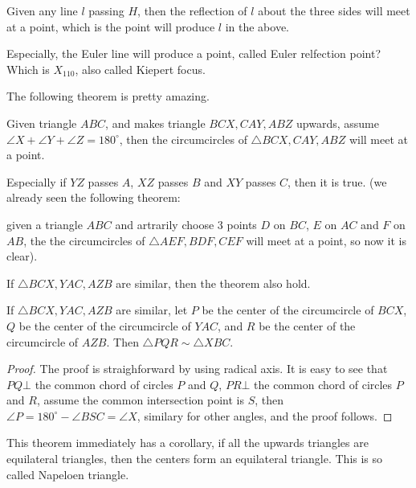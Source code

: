 Given any line $l$ passing $H$, then the reflection of $l$ about the three sides will meet at a point, which is the point will produce $l$ in
the above.

Especially, the Euler line will produce a point, called Euler relfection point? Which is $X_{110}$, also called Kiepert focus.

The following theorem is pretty amazing.

\begin{theorem}
Given triangle $ABC$, and makes triangle $BCX, CAY, ABZ$ upwards, assume $\angle X+\angle Y+\angle Z=180^\circ$,
then the circumcircles of $\triangle BCX, CAY, ABZ$ will meet at a point.

\end{theorem}

Especially if $YZ$ passes $A$, $XZ$ passes $B$ and $XY$ passes $C$, then it is true. (we already seen the following theorem:
\begin{theorem}
given a triangle $ABC$ and artrarily choose 3 points $D$ on $BC$, $E$ on $AC$ and $F$ on $AB$, the the circumcircles of
$\triangle AEF, BDF, CEF$ will meet at a point, so now it is clear).

\end{theorem}

\begin{theorem}
If $\triangle BCX, YAC, AZB$ are similar, then the theorem also hold.
\end{theorem}

\begin{theorem}

If $\triangle BCX, YAC, AZB$ are similar, let $P$ be the center of the circumcircle of $BCX$, $Q$ be
the center of the circumcircle of $YAC$, and $R$ be the center of the circumcircle of $AZB$.
Then $\triangle PQR\sim \triangle XBC$.
\end{theorem}

\begin{proof}
The proof is straighforward by using radical axis. It is easy to see that $PQ\bot $ the common chord of circles $P$ and $Q$,
$PR\bot $ the common chord of circles $P$ and $R$, assume the common intersection point is $S$, then
$\angle P = 180^\circ-\angle BSC=\angle X$, similary for other angles, and the proof follows.
\end{proof}

This theorem immediately has a corollary, if all the upwards triangles are equilateral triangles, then
the centers form an equilateral triangle. This is so called Napeloen triangle.


